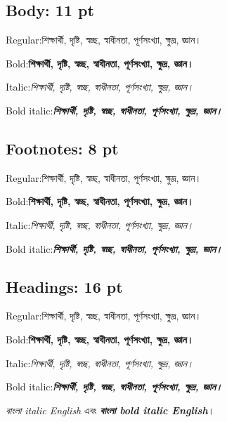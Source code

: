 \newcommand\facesample{শিক্ষার্থী, দৃষ্টি, স্বচ্ছ, স্বাধীনতা, পূর্ণসংখ্যা, ক্ষুদ্র, জ্ঞান।}
\newcommand\facerows{%
  Regular:\quad\facesample\par\smallskip
  Bold:\quad\textbf{\facesample}\par\smallskip
  Italic:\quad\textit{\facesample}\par\smallskip
  Bold italic:\quad\textbf{\textit{\facesample}}\par
}
\setlength{\parindent}{0pt}
\subsection*{Body: 11 pt}
{\fontsize{11}{16.5}\selectfont\facerows}
\subsection*{Footnotes: 8 pt}
{\fontsize{8}{12}\selectfont\facerows}
\subsection*{Headings: 16 pt}
{\fontsize{16}{24}\selectfont\facerows}
\medskip
\textit{বাংলা italic English} এবং \textbf{\textit{বাংলা bold italic English}}।
